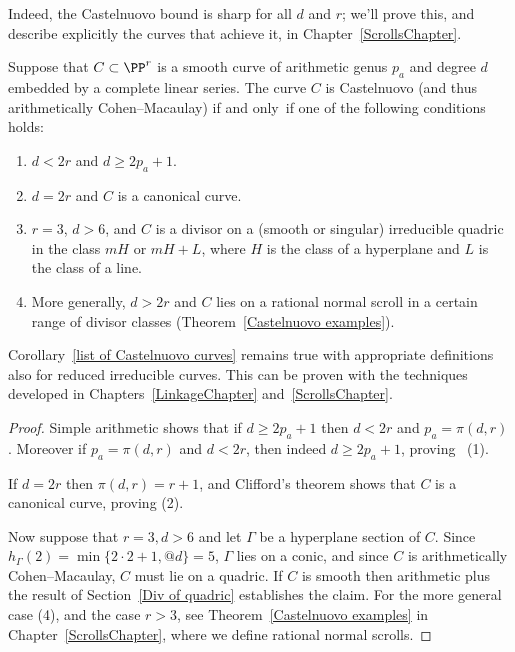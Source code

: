 Indeed, the Castelnuovo bound is sharp for all $d$ and $r$; we'll
prove this, and describe explicitly the curves that achieve it, in
Chapter~\ref{ScrollsChapter}.


\begin{corollary}\label{list of Castelnuovo curves}
Suppose that $C\subset \PP^r$ is a smooth curve of arithmetic genus
$p_{a}$ and degree $d$ embedded by a complete linear series. The curve
$C$ is  Castelnuovo (and thus arithmetically Cohen--Macaulay) if and
only~if one of the following 
conditions
holds:
\begin{enumerate}
\item  $d<2r$ and  $d \geq 2p_a+1$.
\item $d=2r$ 
and
$C$ is a canonical curve.
\item $r=3$, $d>6$, 
and
$C$ is a divisor on a (smooth or singular)
irreducible quadric in the class $mH$ or $mH+L$, where $H$ is the class
of a hyperplane and $L$ is the class of a line.
\item  More generally,  $d>2r$ 
and
$C$ lies on a rational normal scroll in a certain range of divisor classes
\rm
(Theorem~\ref{Castelnuovo examples}).
\end{enumerate}
\end{corollary}

\begin{fact}
Corollary~\ref{list of Castelnuovo curves} remains true with appropriate
definitions also for reduced irreducible curves. This can be proven
with the techniques developed in Chapters~\ref{LinkageChapter}
and~\ref{ScrollsChapter}.
\end{fact}

\begin{proof}
Simple arithmetic shows that if $d\geq 2p_a+1$  then  $d<2r$ and $p_a=
\pi(d,r)$. Moreover if $p_a= \pi(d,r)$ and $d<2r$,
then indeed $d\geq 2p_a+1$, proving~
(1).

If $d= 2r$ then $\pi(d,r) = r+1$, and Clifford's theorem shows that $C$
is a canonical curve, proving 
(2).

Now suppose that $r=3, d>6$ and let $\Gamma$ be a hyperplane
section of $C$. Since $h_{\Gamma}(2) = \min\{2\cdot 2+1,@ d\} = 5$, 
$\Gamma$
lies on a conic, and
since $C$ is arithmetically Cohen--Macaulay, $C$ must lie on a quadric.
If $C$ is smooth then arithmetic plus the result of Section~\ref{Div of
quadric} establishes the 
claim.
For the more general case (4),
and the case $r>3$, see Theorem~\ref{Castelnuovo examples}
in Chapter~\ref{ScrollsChapter}, where we define rational normal scrolls.
\end{proof}

